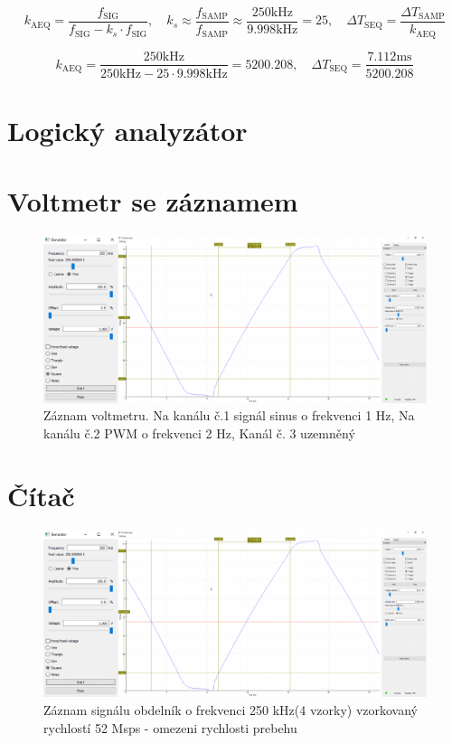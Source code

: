 \begin{equation}
	k_{\text{AEQ}}=\frac{f_{\text{SIG}}}{f_{\text{SIG}}-k_s\cdot f_{\text{SIG}}}, \quad k_s\approx\frac{f_{\text{SAMP}}}{f_{\text{SAMP}}}\approx\frac{250\text{kHz}}{9.998\text{kHz}}=25,\quad \Delta T_{\text{SEQ}}=\frac{\Delta T_{\text{SAMP}}}{k_{\text{AEQ}}}
\end{equation}

\begin{equation}
	k_{\text{AEQ}}=\frac{250\text{kHz}}{250\text{kHz}-25\cdot9.998\text{kHz}}=5200.208,\quad \Delta T_{\text{SEQ}}=\frac{7.112\text{ms}}{5200.208}
\end{equation}

\section{Logický analyzátor}

\section{Voltmetr se záznamem}
\begin{figure}[H]
	\centering
	\includegraphics[width=0.9\linewidth]{Figs/Screenshots/RychlostPrebehu.pdf}
	\caption{Záznam voltmetru. Na kanálu č.1 signál sinus o frekvenci 1 Hz, Na kanálu č.2 PWM o frekvenci 2 Hz, Kanál č. 3 uzemněný}
	\label{fig:Voltmetr}
\end{figure}

\section{Čítač}

\begin{figure}[H]
	\centering
	\includegraphics[width=0.9\linewidth]{Figs/Screenshots/RychlostPrebehu.pdf}
	\caption{Záznam signálu obdelník o frekvenci 250 kHz(4 vzorky) vzorkovaný rychlostí 52 Msps - omezeni rychlosti prebehu}
	\label{fig:Obdelnik250k}
\end{figure}



